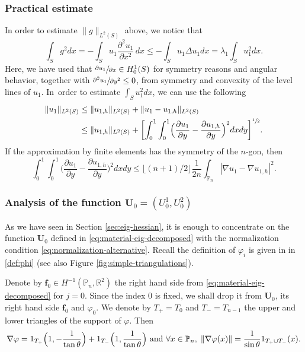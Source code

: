 \documentclass[11pt]{article}
\numberwithin{equation}{section}\newtheorem*{jepEnonce}{\jepEnonceTitle}\newenvironment{enonce*}[1]{\def\jepEnonceTitle{#1}\jepEnonce}{\endjepEnonce}\newtheorem*{conj*}{Conjecture}
\theoremstyle{plain}
\theoremstyle{definition}
\newcommand{\bo}[1]{{\boldsymbol#1}}
\let\Bbb\mathbb
\def\Pp{{\mathbb{P}_n}}
\newcommand{\vphi}{\varphi}
\newcommand{\lb}{\lambda}
\let\jepOriginalSfrac\sfrac
\renewcommand{\sfrac}[2]{{\jepOriginalSfrac{#1}{#2}}}
\begin{document}
\subsubsection*{Practical estimate} In order to estimate $ \|g\|_{L^2(S)}$ above, we notice that
\[
\int_S g^2dx = - \int_S u_1 \frac {\partial^2 u_1} {\partial x^2}\, dx\le - \int_S u_1 \Delta u_1dx= \lb_1 \int_S u_1^2dx.
\]
Here, we have used that $ \sfrac{\partial u_1}{\partial x}\in H^1_0(S)$ for symmetry reasons and angular behavior, together with $\sfrac {\partial^2 u_1} {\partial y^2} \le 0$, from symmetry and convexity of the level lines of $u_1$. In~order to estimate $ \int_S u_1^2dx$, we can use the following
\begin{align*}
\|u_1\|_{L^2(S)} &\le \|u_{1,h}\|_{L^2(S)}+\|u_1-u_{1,h}\|_{L^2(S)} \\
&\le \|u_{1,h}\|_{L^2(S)}+ \biggl[\int_{0}^{1} \int_0^{1} \Bigl(\frac{\partial u_1}{\partial y}-\frac{\partial u_{1,h}}{\partial y}\Bigr)^2 dx dy\biggr]^{\sfrac 12}.
\end{align*}
If the approximation by finite elements has the symmetry of the $n$-gon, then
\[
\int_{0}^{1} \int_0^{1} \Big (\frac{\partial u_1}{\partial y}-\frac{\partial u_{1,h}}{\partial y}\Big)^2 dx dy\le \lfloor (n+1)/2\rfloor \frac{1}{2n}\int_{\Pp} |\nabla u_1-\nabla u_{1,h} |^2.
\]

\subsubsection*{Analysis of the function $\bo U_0= (U_0^1, U_0^2)$} As we have seen in Section \ref{sec:eig-hessian}, it is enough to concentrate on the function $\bo U_0$ defined in \eqref{eq:material-eig-decomposed} with the normalization condition \eqref{eq:normalization-alternative}. Recall the definition of $\varphi_i$ is given in in \eqref{def:phi} (see also Figure \ref{fig:simple-triangulations}).

Denote by $\bo f_0\in H^{-1}(\Pp,\Bbb{R}^2)$ the right hand side from \eqref{eq:material-eig-decomposed} for $j=0$. Since the index $0$ is fixed, we shall drop it from $\bo U_0$, its right hand side $\bo f_0$ and $\vphi_0$. We denote by $T_+=T_0$ and $ T_-=T_{n-1}$ the upper and lower triangles of the support of $\vphi$. Then
\[
\nabla \vphi= 1_{T_+} \Bigl (1,-\frac{1}{\tan \theta }\Bigr) + 1_{T_-} \Bigl (1,\frac{1}{\tan \theta}\Bigr) \mbox{ and } \forall x \in \Pp, \; \|\nabla \varphi (x) \|= \frac{1}{\sin \theta} 1_{T_+\cup T_-}(x).
\]
\end{document}
